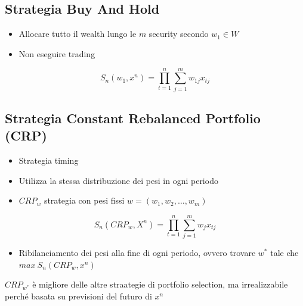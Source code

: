 \documentclass[12pt]{article}
\begin{document}
\subsection{Strategia Buy And Hold}
\begin{itemize}
    \item Allocare tutto il wealth lungo le $m$ security secondo $w_1\in W$
    \item Non eseguire trading
\end{itemize}
$$S_n(w_1,x^n)=\prod_{t=1}^n\sum_{j=1}^mw_{1j}x_{tj} $$
\subsection{Strategia Constant Rebalanced Portfolio (CRP)}
\begin{itemize}
    \item Strategia timing
    \item Utilizza la stessa distribuzione dei pesi in ogni periodo
    \item $CRP_w$ strategia con pesi fissi $w=(w_1,w_2,\dots,w_m)$
\end{itemize}
$$S_n(CRP_w, X^n)=\prod_{t=1}^n\sum_{j=1}^mw_jx_{tj}$$
\begin{itemize}
    \item Ribilanciamento dei pesi alla fine di ogni periodo, ovvero trovare $w^*$ tale che $max \ S_n(CRP_w,x^n)$
\end{itemize}
$CRP_{w^*}$ è migliore delle altre straategie di portfolio selection, ma irrealizzabile perché basata su previsioni del futuro di $x^n$
\end{document}
